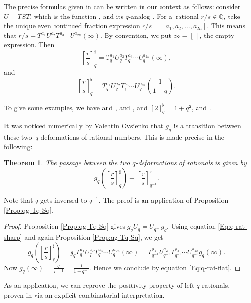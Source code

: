 \documentclass[10pt,a4paper]{amsart}
\numberwithin{equation}{section}
\newtheorem{Theorem}{Theorem}[section]
\newcommand*{\Q}{\mathbb{Q}}
\begin{document}
The precise formulas given in \cite[Definition~2.6]{bapat2023q} can be written in our context as follows: consider $U=TST$, which is the function , and its $q$-analog . For a~rational $r/s\in \Q$, take the unique even continued fraction expression $r/s=[a_1,a_2,\dots,a_{2n}]$. This means that $r/s=T^{a_1}U^{a_2}T^{a_3}\cdots U^{a_{2n}}(\infty)$. By convention, we put $\infty=[\,]$, the empty expression. Then
\begin{equation}\label{Eq:q-rat-sharp}
\left[\frac{r}{s}\right]_q^\sharp = T_q^{a_1}U_q^{a_2}T_q^{a_3}\cdots U_q^{a_{2n}}(\infty),
\end{equation}
and
\begin{equation}\label{Eq:q-rat-flat}
\left[\frac{r}{s}\right]_q^\flat = T_q^{a_1}U_q^{a_2}T_q^{a_3}\cdots U_q^{a_{2n}}\left(\frac{1}{1-q}\right).
\end{equation}

To give some examples, we have  and ,  and ,  and $[2]_q^\flat=1+q^2$,  and .


It was noticed numerically by Valentin Ovsienko that $g_q$ is a transition between these two~$q$-deformations of rational numbers. This is made precise in the following:
\begin{Theorem}\label{Thm:passage}
The passage between the two $q$-deformations of rationals is given by
\[
g_q\left(\left[\frac{r}{s}\right]_q^\sharp\right)=\left[\frac{r}{s}\right]_{q^{-1}}^\flat.
\]
\end{Theorem}
Note that $q$ gets inversed to $q^{-1}$. The proof is an application of Proposition \ref{Prop:qg-Tq-Sq}.
\begin{proof}
Proposition \ref{Prop:qg-Tq-Sq} gives $g_qU_q=U_{q^{-1}}g_q$. Using equation \eqref{Eq:q-rat-sharp} and again Proposition \ref{Prop:qg-Tq-Sq}, we get
\[
g_q\left(\left[\frac{r}{s}\right]_q^\sharp\right)=g_qT_q^{a_1}U_q^{a_2}T_q^{a_3}\cdots U_q^{a_{2n}}(\infty)=T_{q^{-1}}^{a_1}U_{q^{-1}}^{a_2}T_{q^{-1}}^{a_3}\cdots U_{q^{-1}}^{a_{2n}}g_q(\infty).
\]
Now $g_q(\infty)=\tfrac{q}{q-1}=\tfrac{1}{1-q^{-1}}$. Hence we conclude by equation \eqref{Eq:q-rat-flat}.
\end{proof}

As an application, we can reprove the positivity property of left $q$-rationals, proven in \cite[Appendix A.1]{bapat2023q} via an explicit combinatorial interpretation.
\end{document}

